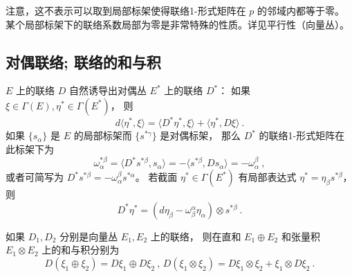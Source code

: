 注意，这不表示可以取到局部标架使得联络1-形式矩阵在 $p$ 的邻域内都等于零。 某个局部标架下的联络系数局部为零是非常特殊的性质。详见平行性（向量丛）。

\subsection{对偶联络; 联络的和与积}
$E$ 上的联络 $D$ 自然诱导出对偶丛 $E^*$ 上的联络 $D^*$： 如果 $\xi\in\Gamma(E),\eta^*\in\Gamma(E^*)$， 则
$$
d\langle \eta^*,\xi\rangle=\langle D^*\eta^*,\xi\rangle+\langle \eta^*,D\xi\rangle~.
$$
如果 $\{s_\alpha\}$ 是 $E$ 的局部标架而 $\{s^{*\gamma}\}$ 是对偶标架， 那么 $D^*$ 的联络1-形式矩阵在此标架下为
$$
\omega^{*\beta}_\alpha
=\langle D^*s^{*\beta},s_\alpha\rangle
=-\langle s^{*\beta},Ds_\alpha\rangle
=-\omega^\beta_\alpha~,
$$
或者可简写为 $D^*s^{*\beta}=-\omega^\beta_\alpha s^{*\alpha}$。 若截面 $\eta^*\in\Gamma(E^*)$ 有局部表达式 $\eta^*=\eta_\beta s^{*\beta}$， 则
$$
D^*\eta^*=(d\eta_\beta-\omega_\beta^\alpha\eta_\alpha)\otimes s^{*\beta}~.
$$

如果 $D_1,D_2$ 分别是向量丛 $E_1,E_2$ 上的联络， 则在直和 $E_1\oplus E_2$ 和张量积 $E_1\otimes E_2$ 上的和与积分别为
$$
D(\xi_1\oplus \xi_2)=D\xi_1\oplus D\xi_2~,
\,
D(\xi_1\otimes \xi_2)=D\xi_1\otimes \xi_2+\xi_1\otimes D\xi_2~.
$$
